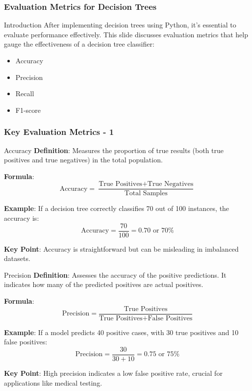 \documentclass[aspectratio=169]{beamer}
\begin{document}
\begin{frame}[fragile]
    \frametitle{Evaluation Metrics for Decision Trees}
    \begin{block}{Introduction}
        After implementing decision trees using Python, it's essential to evaluate performance effectively. This slide discusses evaluation metrics that help gauge the effectiveness of a decision tree classifier: 
        \begin{itemize}
            \item Accuracy
            \item Precision
            \item Recall
            \item F1-score
        \end{itemize}
    \end{block}
\end{frame}

\begin{frame}[fragile]
    \frametitle{Key Evaluation Metrics - 1}
    \begin{block}{Accuracy}
        \textbf{Definition}: Measures the proportion of true results (both true positives and true negatives) in the total population.

        \textbf{Formula}:
        \begin{equation}
            \text{Accuracy} = \frac{\text{True Positives} + \text{True Negatives}}{\text{Total Samples}}
        \end{equation}
        
        \textbf{Example}: 
        If a decision tree correctly classifies 70 out of 100 instances, the accuracy is:
        \begin{equation}
            \text{Accuracy} = \frac{70}{100} = 0.70 \text{ or } 70\%
        \end{equation}
        
        \textbf{Key Point}: Accuracy is straightforward but can be misleading in imbalanced datasets.
    \end{block}

    \begin{block}{Precision}
        \textbf{Definition}: Assesses the accuracy of the positive predictions. It indicates how many of the predicted positives are actual positives.
        
        \textbf{Formula}:
        \begin{equation}
            \text{Precision} = \frac{\text{True Positives}}{\text{True Positives} + \text{False Positives}}
        \end{equation}

        \textbf{Example}: 
        If a model predicts 40 positive cases, with 30 true positives and 10 false positives:
        \begin{equation}
            \text{Precision} = \frac{30}{30 + 10} = 0.75 \text{ or } 75\%
        \end{equation}

        \textbf{Key Point}: High precision indicates a low false positive rate, crucial for applications like medical testing.
    \end{block}
\end{frame}
\end{document}
